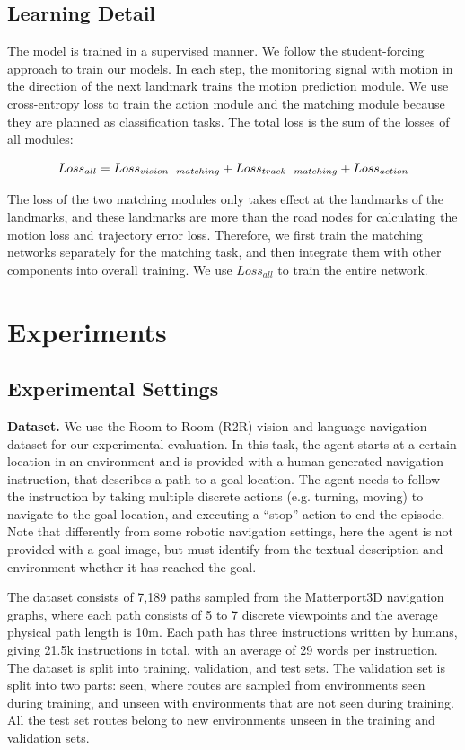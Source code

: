 \subsection{Learning Detail}
	
The model is trained in a supervised manner. We follow the student-forcing approach to train our models. In each step, the monitoring signal with motion in the direction of the next landmark trains the motion prediction module. We use cross-entropy loss to train the action module and the matching module because they are planned as classification tasks. The total loss is the sum of the losses of all modules:
	
\begin{equation}
	\centering
	{Loss}_{all} = {Loss}_{vision-matching} + {Loss}_{track-matching} + {Loss}_{action}
\end{equation}

The loss of the two matching modules only takes effect at the landmarks of the landmarks, and these landmarks are more than the road nodes for calculating the motion loss and trajectory error loss. Therefore, we first train the matching networks separately for the matching task, and then integrate them with other components into overall training. We use ${Loss}_{all}$ to train the entire network.

\section{Experiments}
	
\subsection{Experimental Settings}
	
\textbf{Dataset.} We use the Room-to-Room (R2R) vision-and-language navigation dataset for our experimental evaluation\cite{anderson2018vision}. In this task, the agent starts at a certain location in an environment and is provided with a human-generated navigation instruction, that describes a path to a goal location. The agent needs to follow the instruction by taking multiple discrete actions (e.g. turning, moving) to navigate to the goal location, and executing a “stop” action to end the episode. Note that differently from some robotic navigation settings, here the agent is not provided with a goal image, but must identify from the textual description and environment whether it has reached the goal.
	
The dataset consists of 7,189 paths sampled from the Matterport3D navigation graphs, where each path consists of 5 to 7 discrete viewpoints and the average physical path length is 10m. Each path has three instructions written by humans, giving 21.5k instructions in total, with an average of 29 words per instruction. The dataset is split into training, validation, and test sets. The validation set is split into two parts: seen, where routes are sampled from environments seen during training, and unseen with environments that are not seen during training. All the test set routes belong to new environments unseen in the training and validation sets.

